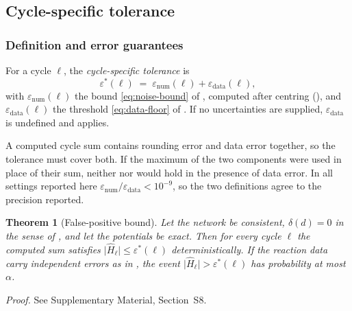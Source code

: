 \documentclass[11pt,a4paper]{article}
\theoremstyle{pstyle}
\newtheorem{theorem}{Theorem}[section]
\theoremstyle{definition}
\theoremstyle{remark}
\newcommand{\abs}[1]{\lvert#1\rvert}
\newcommand{\eps}{\varepsilon}
\newcommand{\epsnum}{\eps_{\mathrm{num}}}
\newcommand{\epsdata}{\eps_{\mathrm{data}}}
\newcommand{\epsstar}{\eps^{\ast}}
\newcommand{\hol}{H}
\begin{document}
\subsection{Cycle-specific tolerance}
\label{sec:tolerance}

\subsubsection{Definition and error guarantees}

\begin{definition}
\label{def:epsstar}
For a cycle $\ell$, the \emph{cycle-specific tolerance} is
\begin{equation}
  \epsstar(\ell) \;=\; \epsnum(\ell)+\epsdata(\ell),
  \label{eq:epsstar}
\end{equation}
with $\epsnum(\ell)$ the bound \eqref{eq:noise-bound} of
, computed after centring (), and
$\epsdata(\ell)$ the threshold \eqref{eq:data-floor} of
. If no uncertainties are supplied, $\epsdata$ is
undefined and  applies.
\end{definition}

\begin{remark}
\label{rem:sum-not-max}
A computed cycle sum contains rounding error and data error together,
so the tolerance must cover both. If the maximum of the two components
were used in place of their sum, neither 
nor  would hold in the presence of data error. In
all settings reported here $\epsnum/\epsdata<10^{-9}$, so the two
definitions agree to the precision reported.
\end{remark}

\begin{theorem}[False-positive bound]
\label{thm:no-false-positive}
Let the network be consistent, $\delta(d)=0$ in the sense of
, and let the potentials be exact. Then for every
cycle $\ell$ the computed sum satisfies
$\abs{\widehat{\hol}_\ell} \le \epsstar(\ell)$ deterministically. If
the reaction data carry independent errors as in
, the event $\abs{\widehat{\hol}_\ell} >
\epsstar(\ell)$ has probability at most $\alpha$.
\end{theorem}

\noindent\emph{Proof.} See Supplementary Material, Section~S8.
\end{document}
